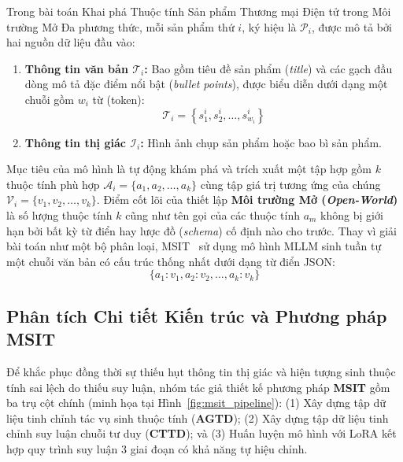 \documentclass[conference,10pt]{IEEEtran}
\begin{document}
Trong bài toán Khai phá Thuộc tính Sản phẩm Thương mại Điện tử trong Môi trường Mở Đa phương thức, mỗi sản phẩm thứ $i$, ký hiệu là $\mathcal{P}_i$, được mô tả bởi hai nguồn dữ liệu đầu vào:
\begin{enumerate}
    \item \textbf{Thông tin văn bản $\mathcal{T}_i$:} Bao gồm tiêu đề sản phẩm (\textit{title}) và các gạch đầu dòng mô tả đặc điểm nổi bật (\textit{bullet points}), được biểu diễn dưới dạng một chuỗi gồm $w_i$ từ (token):
    \begin{equation}
        \mathcal{T}_i = \left\{s_1^i, s_2^i, \dots, s_{w_i}^i\right\}
    \end{equation}
    \item \textbf{Thông tin thị giác $\mathcal{I}_i$:} Hình ảnh chụp sản phẩm hoặc bao bì sản phẩm.
\end{enumerate}

Mục tiêu của mô hình là tự động khám phá và trích xuất một tập hợp gồm $k$ thuộc tính phù hợp $\mathcal{A}_i = \{a_1, a_2, \dots, a_k\}$ cùng tập giá trị tương ứng của chúng $\mathcal{V}_i = \{v_1, v_2, \dots, v_k\}$. Điểm cốt lõi của thiết lập \textbf{Môi trường Mở (\textit{Open-World})} là số lượng thuộc tính $k$ cũng như tên gọi của các thuộc tính $a_m$ không bị giới hạn bởi bất kỳ từ điển hay lược đồ (\textit{schema}) cố định nào cho trước. Thay vì giải bài toán như một bộ phân loại, MSIT~\cite{li2025msit} sử dụng mô hình MLLM sinh tuần tự một chuỗi văn bản có cấu trúc thống nhất dưới dạng từ điển JSON:
\begin{equation}
    \{a_1 : v_1, a_2 : v_2, \dots, a_k : v_k\}
\end{equation}

\subsection{Phân tích Chi tiết Kiến trúc và Phương pháp MSIT}

Để khắc phục đồng thời sự thiếu hụt thông tin thị giác và hiện tượng sinh thuộc tính sai lệch do thiếu suy luận, nhóm tác giả thiết kế phương pháp \textbf{MSIT} gồm ba trụ cột chính (minh họa tại Hình~\ref{fig:msit_pipeline}): (1) Xây dựng tập dữ liệu tinh chỉnh tác vụ sinh thuộc tính (\textbf{AGTD}); (2) Xây dựng tập dữ liệu tinh chỉnh suy luận chuỗi tư duy (\textbf{CTTD}); và (3) Huấn luyện mô hình với LoRA kết hợp quy trình suy luận 3 giai đoạn có khả năng tự hiệu chỉnh.
\end{document}
